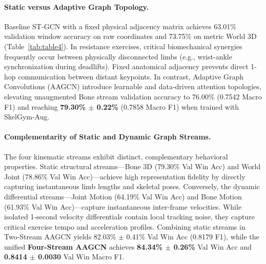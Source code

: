 \documentclass[runningheads]{llncs}
\begin{document}
\paragraph{Static versus Adaptive Graph Topology.} Baseline ST-GCN \cite{yan2018} with a fixed physical adjacency matrix achieves 63.01\% validation window accuracy on raw coordinates and 73.75\% on metric World 3D (Table~\ref{tab:table4}). In resistance exercises, critical biomechanical synergies frequently occur between physically disconnected limbs (e.g., wrist-ankle synchronization during deadlifts). Fixed anatomical adjacency prevents direct 1-hop communication between distant keypoints. In contrast, Adaptive Graph Convolutions (AAGCN) introduce learnable and data-driven attention topologies, elevating unaugmented Bone stream validation accuracy to 76.00\% (0.7542 Macro F1) and reaching \textbf{79.30\% $\pm$ 0.22\%} (0.7858 Macro F1) when trained with SkelGym-Aug.

\paragraph{Complementarity of Static and Dynamic Graph Streams.} The four kinematic streams exhibit distinct, complementary behavioral properties. Static structural streams---Bone 3D (79.30\% Val Win Acc) and World Joint (78.86\% Val Win Acc)---achieve high representation fidelity by directly capturing instantaneous limb lengths and skeletal poses. Conversely, the dynamic differential streams---Joint Motion (64.19\% Val Win Acc) and Bone Motion (61.93\% Val Win Acc)---capture instantaneous inter-frame velocities. While isolated 1-second velocity differentials contain local tracking noise, they capture critical exercise tempo and acceleration profiles. Combining static streams in Two-Stream AAGCN yields 82.03\% $\pm$ 0.41\% Val Win Acc (0.8179 F1), while the unified \textbf{Four-Stream AAGCN} achieves \textbf{84.34\% $\pm$ 0.26\%} Val Win Acc and \textbf{0.8414 $\pm$ 0.0030} Val Win Macro F1.
\end{document}
